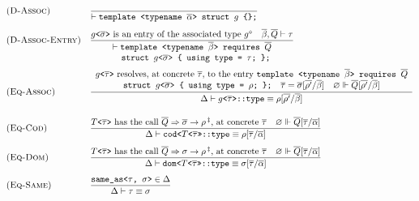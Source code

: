 \begin{figure}[htbp]
\[
\begin{array}{@{}l@{\quad}l@{}}
\textsc{(D-Assoc)} & \dfrac{}{\vdash \texttt{template <typename }\overline{\alpha}\texttt{> struct } g \texttt{ \{\};}}
\\[14pt]
\textsc{(D-Assoc-Entry)} & \dfrac{g\texttt{<}\overline{\sigma}\texttt{>} \text{ is an entry of the associated type } g^{\diamond} \quad \overline{\beta}, \overline{Q} \vdash \tau}{\begin{array}[t]{@{}l@{}}\vdash \texttt{template <typename }\overline{\beta}\texttt{> requires } \overline{Q}\\ \quad\texttt{struct } g\texttt{<}\overline{\sigma}\texttt{> \{ using type = } \tau\texttt{; \};}\end{array}}
\\[26pt]
\textsc{(Eq-Assoc)} & \dfrac{\begin{array}{c} g\texttt{<}\overline{\tau}\texttt{>} \text{ resolves, at concrete } \overline{\tau} \text{, to the entry } \texttt{template <typename }\overline{\beta}\texttt{> requires } \overline{Q} \\ \texttt{struct } g\texttt{<}\overline{\sigma}\texttt{> \{ using type = } \rho\texttt{; \};} \quad \overline{\tau} = \overline{\sigma}[\overline{\rho'}/\overline{\beta}] \quad \varnothing \Vdash \overline{Q}[\overline{\rho'}/\overline{\beta}] \end{array}}{\Delta \vdash g\texttt{<}\overline{\tau}\texttt{>::type} \equiv \rho[\overline{\rho'}/\overline{\beta}]}
\\[22pt]
\textsc{(Eq-Cod)} & \dfrac{T\texttt{<}\overline{\tau}\texttt{>} \text{ has the call } \overline{Q} \Rightarrow \overline{\sigma} \to \rho\,{}^{\ddagger} \text{, at concrete } \overline{\tau} \quad \varnothing \Vdash \overline{Q}[\overline{\tau}/\overline{\alpha}]}{\Delta \vdash \texttt{cod<}T\texttt{<}\overline{\tau}\texttt{>>::type} \equiv \rho[\overline{\tau}/\overline{\alpha}]}
\\[14pt]
\textsc{(Eq-Dom)} & \dfrac{T\texttt{<}\overline{\tau}\texttt{>} \text{ has the call } \overline{Q} \Rightarrow \sigma \to \rho\,{}^{\ddagger} \text{, at concrete } \overline{\tau} \quad \varnothing \Vdash \overline{Q}[\overline{\tau}/\overline{\alpha}]}{\Delta \vdash \texttt{dom<}T\texttt{<}\overline{\tau}\texttt{>>::type} \equiv \sigma[\overline{\tau}/\overline{\alpha}]}
\\[14pt]
\textsc{(Eq-Same)} & \dfrac{\texttt{same\_as<}\tau\texttt{, }\sigma\texttt{>} \in \Delta}{\Delta \vdash \tau \equiv \sigma}

\end{array}\]
\end{figure}
